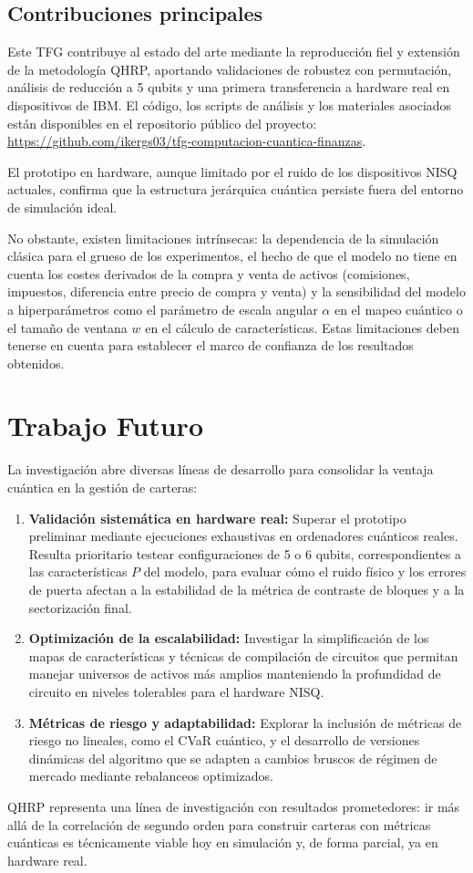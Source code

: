 \subsection{Contribuciones principales}
Este TFG contribuye al estado del arte mediante la reproducción fiel y extensión de la metodología \gls{QHRP}, aportando validaciones de robustez con permutación, análisis de reducción a 5 qubits y una primera transferencia a hardware real en dispositivos de IBM. El código, los scripts de análisis y los materiales asociados están disponibles en el repositorio público del proyecto: \url{https://github.com/ikergs03/tfg-computacion-cuantica-finanzas}.

El prototipo en hardware, aunque limitado por el ruido de los dispositivos \gls{NISQ} actuales, confirma que la estructura jerárquica cuántica persiste fuera del entorno de simulación ideal.

No obstante, existen limitaciones intrínsecas: la dependencia de la simulación clásica para el grueso de los experimentos, el hecho de que el modelo no tiene en cuenta los costes derivados de la compra y venta de activos (comisiones, impuestos, diferencia entre precio de compra y venta) y la sensibilidad del modelo a hiperparámetros como el parámetro de escala angular $\alpha$ en el mapeo cuántico o el tamaño de ventana $w$ en el cálculo de características. Estas limitaciones deben tenerse en cuenta para establecer el marco de confianza de los resultados obtenidos.

\section{Trabajo Futuro}
\label{sec:trabajo_futuro}

La investigación abre diversas líneas de desarrollo para consolidar la ventaja cuántica en la gestión de carteras:

\begin{enumerate}
    \item \textbf{Validación sistemática en hardware real:} Superar el prototipo preliminar mediante ejecuciones exhaustivas en ordenadores cuánticos reales. Resulta prioritario testear configuraciones de 5 o 6 qubits, correspondientes a las características $P$ del modelo, para evaluar cómo el ruido físico y los errores de puerta afectan a la estabilidad de la métrica de contraste de bloques y a la sectorización final.
    
    \item \textbf{Optimización de la escalabilidad:} Investigar la simplificación de los mapas de características y técnicas de compilación de circuitos que permitan manejar universos de activos más amplios manteniendo la profundidad de circuito en niveles tolerables para el hardware \gls{NISQ}.
    
    \item \textbf{Métricas de riesgo y adaptabilidad:} Explorar la inclusión de métricas de riesgo no lineales, como el \gls{CVaR} cuántico, y el desarrollo de versiones dinámicas del algoritmo que se adapten a cambios bruscos de régimen de mercado mediante rebalanceos optimizados.
\end{enumerate}

\gls{QHRP} representa una línea de investigación con resultados prometedores: ir más allá de la correlación de segundo orden para construir carteras con métricas cuánticas es técnicamente viable hoy en simulación y, de forma parcial, ya en hardware real.